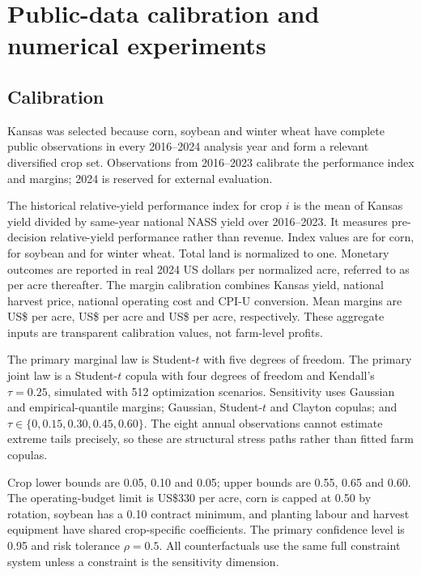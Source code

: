 \section{Public-data calibration and numerical experiments}

\subsection{Calibration}

Kansas was selected because corn, soybean and winter wheat have complete
public observations in every 2016--2024 analysis year and form a relevant
diversified crop set. Observations from 2016--2023 calibrate the performance
index and margins; 2024 is reserved for external evaluation.

The historical relative-yield performance index for crop \(i\) is the mean of
Kansas yield divided by same-year national NASS yield over 2016--2023. It
measures pre-decision relative-yield performance rather than revenue. Index
values are \ScoreCorn{} for corn, \ScoreSoy{} for
soybean and \ScoreWheat{} for winter wheat. Total land is normalized to one.
Monetary outcomes are reported in real 2024 US dollars per normalized acre,
referred to as per acre thereafter. The margin calibration combines Kansas
yield, national harvest price, national operating cost and CPI-U conversion.
Mean margins are US\$\MarginCorn{} per acre, US\$\MarginSoy{} per acre and
US\$\MarginWheat{} per acre, respectively. These aggregate inputs are
transparent calibration values, not farm-level profits.

The primary marginal law is Student-\(t\) with five degrees of freedom. The
primary joint law is a Student-\(t\) copula with four degrees of freedom and
Kendall's \(\tau=0.25\), simulated with 512 optimization scenarios.
Sensitivity uses Gaussian and empirical-quantile margins; Gaussian,
Student-\(t\) and Clayton copulas; and \(\tau\in\{0,0.15,0.30,0.45,0.60\}\).
The eight annual observations cannot estimate extreme tails precisely, so
these are structural stress paths rather than fitted farm copulas.

Crop lower bounds are 0.05, 0.10 and 0.05; upper bounds are 0.55, 0.65 and
0.60. The operating-budget limit is US\$330 per acre, corn is capped at 0.50
by rotation, soybean has a 0.10 contract minimum, and planting labour and
harvest equipment have shared crop-specific coefficients. The primary
confidence level is 0.95 and risk tolerance \(\rho=0.5\). All counterfactuals
use the same full constraint system unless a constraint is the sensitivity
dimension.

